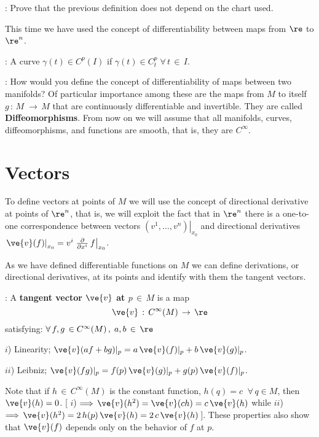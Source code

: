 \espa
\ejer: Prove that the previous definition
does not depend on the chart used.

\espa
This time we have used the concept of differentiability between maps from
$\re$ to $\re^n$.
 
: A curve {$\gamma(t)\in C^p(I)$} if 
$\gamma(t)\in C_t^p\;\forall\,t\,\in\,I$.
\par

\ejer: How would you define the concept of
differentiability of maps between two manifolds?
\espa
Of particular importance among these are the maps from $M$ to itself
$g\,:\,M\;\to\,M$ that are continuously differentiable and
invertible. They are called {\bf Diffeomorphisms}.
From now on we will assume that all manifolds, curves, diffeomorphisms, and
functions are smooth, that is, they are $C^\infty$.


\section {Vectors}



To define vectors at points of $M$ we will use the concept of
directional derivative at points of $\re^n$, that is, we will exploit the
fact that in $\re^n$ there is a one-to-one correspondence between
vectors $\left. (v^1,\ldots, v^n)\right|_{x_0}$ and directional
derivatives  $\left.\ve{v}(f)\right|_{x_0} = v^i\left.
\frac{\partial}{\partial x^i}\,f\right|_{x_0}$.

As we have defined differentiable functions on $M$ we can define
derivations, or directional derivatives, at its points and
identify with them the tangent vectors.

: A {\bf tangent vector ${\ve{ v}}$ at $p\,\in\,M$} is a map \hfill
\[
{\ve{ v}}\,:\,C^\infty(M) \,\to\,\re
\] 
%
satisfying: 
$\forall\,f,g\,\in C^\infty (M) \,,\;a,b\,\in\,\re$

$i$) Linearity; ${\ve{ v}}(af+bg)|_p=a\,{\ve{ v}}(f)|_p+b\,{\ve{ v}}(g)|_p$.

$ii$) Leibniz; ${\ve{ v}}(fg)|_p=f(p)\,{\ve{ v}}(g)|_p+g(p)\,{\ve{ v}}(f)|_p$.

\espa
Note that if $h\,\in\,C^\infty(M)$ is the constant function,
$h(q)=c\;\;\forall\,q\in M$, then ${\ve{ v}}(h)=0$. [ $i$) $\Longrightarrow
\,{\ve{ v}}(h^2)={\ve{ v}}(ch)=c\,{\ve{ v}}(h) $ while $ii$) $\Longrightarrow \,
{\ve{ v}}(h^2)=2\,h(p)\,{\ve{ v}}(h) =2\,c\,{\ve{ v}}(h)\,$]. These properties also show
 that ${\ve{ v}}(f)$ depends only on the behavior of $f$ at $p$.
 
